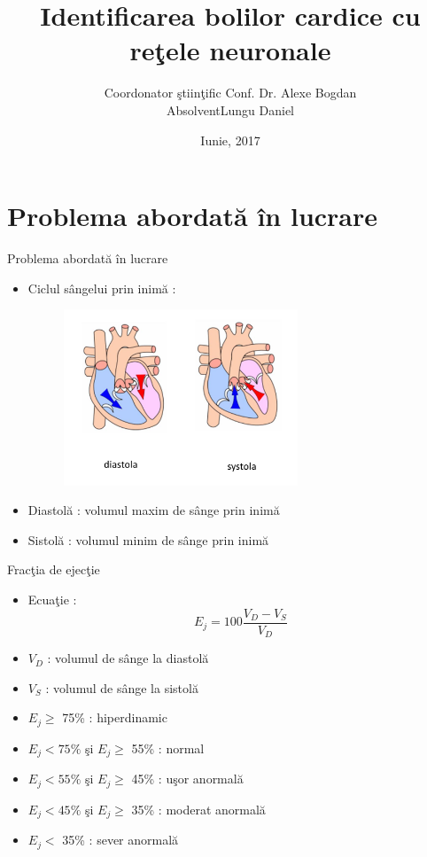 \documentclass[xcolor=svgnames,handout]{beamer}
\title
  [Identificarea bolilor cardice cu re\c{t}ele neuronale\hspace{2em}]
  {Identificarea bolilor cardice cu re\c{t}ele neuronale}
\author
  [Lungu Daniel]
  {Coordonator \c{s}tiin\c{t}ific \quad Conf. Dr. Alexe Bogdan
  \\
  Absolvent\quad Lungu Daniel}
\date
  {Iunie, 2017}
\institute
  {Universitatea Bucure\c{t}i
  \\ Facultatea de Matematic\u{a} \c{s}i Informatic\u{a}
  \\ Specializarea Calculatoare \c{s}i Tehnologia Informa\c{t}iei}
\begin{document}
\maketitle

\section
  {Problema abordat\u{a} \^{i}n lucrare}

\begin{frame}
  {Problema abordat\u{a} \^{i}n lucrare}


\begin{itemize}
\item Ciclul s\^{a}ngelui prin inim\u{a} :
\begin{figure}[t]
    \includegraphics[width=7cm]{diastola+systola.jpg}
    \centering
\end{figure}
\item Diastol\u{a} : volumul maxim de s\^{a}nge prin inim\u{a}
\item Sistol\u{a} : volumul minim de s\^{a}nge prin inim\u{a}
 \end{itemize}
\end{frame}


\begin{frame}
  {Frac\c{t}ia de ejec\c{t}ie}

  \begin{itemize}
  \item Ecua\c{t}ie :
    \begin{equation*}
      E_{j} = 100 \frac{V_D - V_S}{V_D}
    \end{equation*}
    
  \item $V_D$ : volumul de s\^{a}nge la diastol\u{a}
  \item $V_S$ : volumul de s\^{a}nge la sistol\u{a}
  \item $E_j \geq $  75\% : hiperdinamic
  \item $E_j < 75 \% $ \c{s}i $E_j \geq $  55\% : normal
  \item $E_j < 55 \% $ \c{s}i $E_j \geq $  45\% : u\c{s}or anormal\u{a}
  \item $E_j < 45 \% $ \c{s}i $E_j \geq $  35\% : moderat anormal\u{a}
  \item $E_j < $  35\% : sever anormal\u{a}
  
  \end{itemize}
\end{frame}
\end{document}

